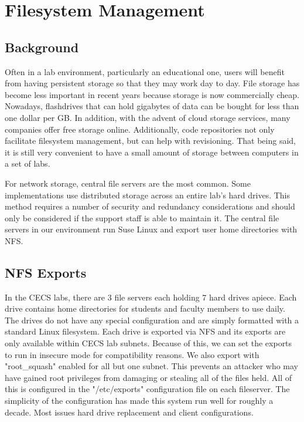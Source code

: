 \section{Filesystem Management} \label{sec:filesystem_management}
\subsection{Background}
Often in a lab environment, particularly an educational one, users will benefit from having persistent storage so that they may work day to day.   File storage has become less important in recent years because storage is now commercially cheap.  Nowadays, flashdrives that can hold gigabytes of data can be bought for less than one dollar per GB.  In addition, with the advent of cloud storage services, many companies offer free storage online.  Additionally, code repositories not only facilitate filesystem management, but can help with revisioning.   That being said, it is still very convenient to have a small amount of storage between computers in a set of labs.  

For network storage, central file servers are the most common.  Some implementations use distributed storage across an entire lab's hard drives.  This method requires a number of security and redundancy considerations and should only be considered if the support staff is able to maintain it.  The central file servers in our environment run Suse Linux and export user home directories with NFS.  

\subsection{NFS Exports}
In the CECS labs, there are 3 file servers each holding 7 hard drives apiece.  Each drive contains home directories for students and faculty members to use daily.  The drives do not have any special configuration and are simply formatted with a standard Linux filesystem.  Each drive is exported via NFS and its exports are only available within CECS lab subnets.  Because of this, we can set the exports to run in insecure mode for compatibility reasons.  We also export with "root\_squash" enabled for all but one subnet.  This prevents an attacker who may have gained root privileges from damaging or stealing all of the files held.  All of this is configured in the "/etc/exports" configuration file on each fileserver.  The simplicity of the configuration has made this system run well for roughly a decade.  Most issues hard drive replacement and client configurations.

